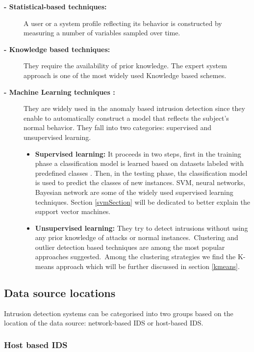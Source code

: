 				\begin{description}
					\item[\textbf{- Statistical-based techniques:}] A user or a system profile reflecting its behavior is constructed by measuring a number of variables sampled over time.
					\item[\textbf{- Knowledge based techniques:}] They require the availability of prior knowledge. The expert system approach is one of the most widely used Knowledge based schemes.
					\item[\textbf{- Machine Learning techniques :}] They are widely used in the anomaly based intrusion detection since they enable to automatically construct a model that reflects the subject's normal behavior. They fall into two categories: supervised and unsupervised learning.

						\begin{itemize}
							\item { \textbf{Supervised learning:}} It proceeds in two steps, first in the training phase a classification model is learned based on datasets labeled with predefined classes . Then, in the testing phase, ths classification model is used to predict the classes of new instances. SVM, neural networks, Bayesian network are some of the widely used supervised learning techniques. Section \ref{svmSection} will be dedicated to better explain the support vector machines.
							\item { \textbf{Unsupervised learning:}} They try to detect intrusions without using any prior knowledge of attacks or normal instances.\ Clustering and outlier detection based techniques are among the most popular approaches suggested.\ Among the clustering strategies we find the K-means approach which will be further discussed in section \ref{kmeans}.

						\end{itemize}
				\end{description}

			\subsection{Data source locations} 
				
				Intrusion detection systems can be categorised into two groups based on the location of the data source: network-based IDS or host-based IDS.

				\subsubsection*{Host based IDS}

